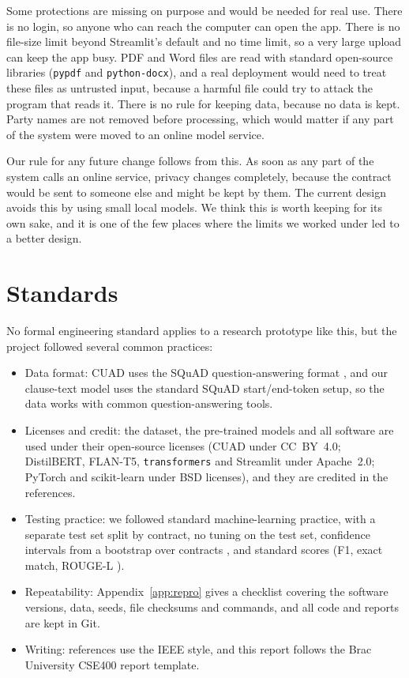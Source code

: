 Some protections are missing on purpose and would be needed for real use. There is no login, so anyone who can reach the computer can open the app. There is no file-size limit beyond Streamlit's default and no time limit, so a very large upload can keep the app busy. PDF and Word files are read with standard open-source libraries (\texttt{pypdf} and \texttt{python-docx}), and a real deployment would need to treat these files as untrusted input, because a harmful file could try to attack the program that reads it. There is no rule for keeping data, because no data is kept. Party names are not removed before processing, which would matter if any part of the system were moved to an online model service.

Our rule for any future change follows from this. As soon as any part of the system calls an online service, privacy changes completely, because the contract would be sent to someone else and might be kept by them. The current design avoids this by using small local models. We think this is worth keeping for its own sake, and it is one of the few places where the limits we worked under led to a better design.

\section{Standards}
No formal engineering standard applies to a research prototype like this, but the project followed several common practices:
\begin{itemize}[itemsep=2pt]
  \item Data format: CUAD uses the SQuAD question-answering format \cite{rajpurkar2016squad}, and our clause-text model uses the standard SQuAD start/end-token setup, so the data works with common question-answering tools.
  \item Licenses and credit: the dataset, the pre-trained models and all software are used under their open-source licenses (CUAD under CC~BY~4.0; DistilBERT, FLAN-T5, \texttt{transformers} and Streamlit under Apache~2.0; PyTorch and scikit-learn under BSD licenses), and they are credited in the references.
  \item Testing practice: we followed standard machine-learning practice, with a separate test set split by contract, no tuning on the test set, confidence intervals from a bootstrap over contracts \cite{efron1979bootstrap}, and standard scores (F1, exact match, ROUGE-L \cite{lin2004rouge}).
  \item Repeatability: Appendix~\ref{app:repro} gives a checklist covering the software versions, data, seeds, file checksums and commands, and all code and reports are kept in Git.
  \item Writing: references use the IEEE style, and this report follows the Brac University CSE400 report template.
\end{itemize}

